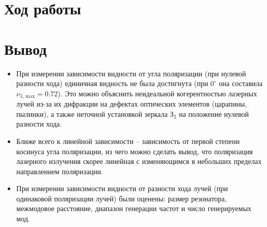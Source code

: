 \documentclass{letask}
\begin{document}
\newpage
\section*{Ход работы}


\section*{Вывод}

\begin{itemize}
    \item При измерении зависимости видности от угла поляризации (при нулевой разности хода) единичная видность не была достигнута (при $0^{\circ}$ она составила $\nu_{3\text{, max}} = 0.72$). Это можно объяснить неидеальной когерентностью лазерных лучей из-за их дифракции на дефектах оптических элементов (царапины, пылинки), а также неточной установкой зеркала $\text{З}_2$ на положение нулевой разности хода. 
    \item Ближе всего к линейной зависимости -- зависимость от первой степени косинуса угла поляризации, из чего можно сделать вывод, что поляризация лазерного излучения скорее линейная с изменяющимся в небольших пределах направлением поляризации.
    \item При измерении зависимости видности от разности хода лучей (при одинаковой поляризации лучей) были оценены: размер резонатора, межмодовое расстояние, диапазон генерации частот и число генерируемых мод.
\end{itemize}
\end{document}
